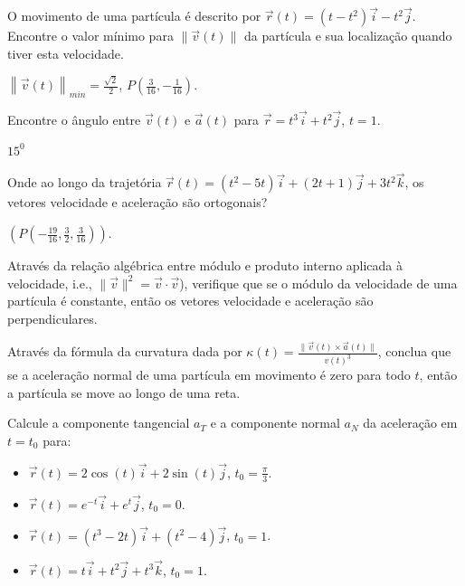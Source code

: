 \begin{exer}
O movimento de uma partícula é descrito por $\vec{r}(t)=(t-t^2)\vec{i}-t^2\vec{j}$. Encontre o valor mínimo  para $\|\vec{v}(t)\|$ da partícula e sua localização quando tiver esta velocidade.
\end{exer}
\begin{resp}
 $\left\|\vec{v}(t)\right\|_{min}=\frac{\sqrt{2}}{2}$, $P\left(\frac{3}{16},-\frac{1}{16}\right)$.
 \end{resp}
\begin{exer}
 Encontre o ângulo entre $\vec{v}(t)$ e $\vec{a}(t)$ para $\vec{r}=t^3\vec{i}+t^2\vec{j}$, $t=1$.
\end{exer}
\begin{resp}
 $15^0$
\end{resp}
\begin{exer}
 Onde ao longo da trajetória $\vec{r}(t)=(t^2-5t)\vec{i}+(2t+1)\vec{j}+3t^2\vec{k}$, os vetores velocidade e aceleração são ortogonais?
\end{exer}
\begin{resp}
 $\left(P\left(-\frac{19}{16},\frac{3}{2},\frac{3}{16}\right)\right)$.
\end{resp}
\begin{exer} Através da relação algébrica entre módulo e produto interno aplicada à velocidade, i.e., $\|\vec{v}\|^2=\vec{v}\cdot\vec{v}$), verifique  que se o módulo da velocidade de uma partícula é constante, então os vetores velocidade e aceleração são perpendiculares.
\end{exer}
\begin{exer} Através da fórmula da curvatura dada por $\kappa(t)=\frac{\|\vec{v}(t)\times \vec{a}(t)\|}{v(t)^3} $, conclua que se a aceleração normal de uma partícula em movimento é zero para todo $t$, então a partícula se move ao longo de uma reta.
\end{exer}
\begin{exer} Calcule a componente tangencial $a_T$ e a componente normal $a_N$ da aceleração em $t=t_0$ para:
\begin{itemize}
 \item[a)] $\vec{r}(t)=2\cos(t)\vec{i}+2\sin(t)\vec{j}$, $t_0=\frac{\pi}{3}$.
 \item[b)] $\vec{r}(t)=e^{-t}\vec{i}+e^{t}\vec{j}$, $t_0=0$.
 \item[c)] $\vec{r}(t)=(t^3-2t)\vec{i}+(t^2-4)\vec{j}$, $t_0=1$.
 \item[d)] $\vec{r}(t)=t\vec{i}+t^2\vec{j}+t^3\vec{k}$, $t_0=1$.
\end{itemize}
\end{exer}
